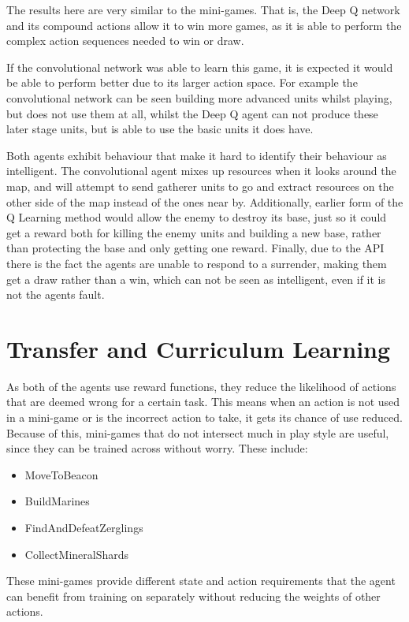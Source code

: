 The results here are very similar to the mini-games. That is, the Deep Q network
and its compound actions allow it to win more games, as it is able to perform
the complex action sequences needed to win or draw.

If the convolutional network was able to learn this game, it is expected it
would be able to perform better due to its larger action space. For example the
convolutional network can be seen building more advanced units whilst playing,
but does not use them at all, whilst the Deep Q agent can not produce these
later stage units, but is able to use the basic units it does have.

Both agents exhibit behaviour that make it hard to identify their behaviour as
intelligent. The convolutional agent mixes up resources when it looks around the
map, and will attempt to send gatherer units to go and extract resources on the
other side of the map instead of the ones near by. Additionally, earlier form of
the Q Learning method would allow the enemy to destroy its base, just so it
could get a reward both for killing the enemy units and building a new base,
rather than protecting the base and only getting one reward. Finally, due to the
API there is the fact the agents are unable to respond to a surrender, making
them get a draw rather than a win, which can not be seen as intelligent, even if
it is not the agents fault.

\section{Transfer and Curriculum Learning}

As both of the agents use reward functions, they reduce the likelihood of
actions that are deemed wrong for a certain task. This means when an action is
not used in a mini-game or is the incorrect action to take, it gets its chance
of use reduced. Because of this, mini-games that do not intersect much in
play style are useful, since they can be trained across without worry. These
include:

\begin{itemize}
    \item MoveToBeacon
    \item BuildMarines
    \item FindAndDefeatZerglings
    \item CollectMineralShards
\end{itemize}

These mini-games provide different state and action requirements that the
agent can benefit from training on separately without reducing the weights of
other actions.

